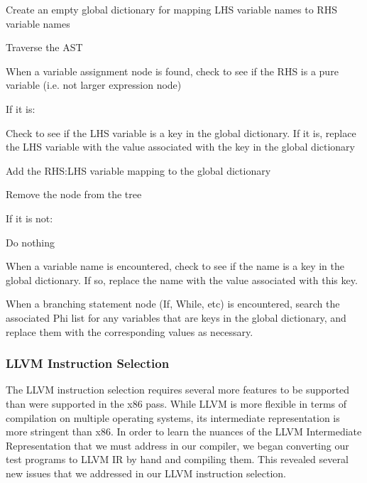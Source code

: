 \documentclass[11pt,twocolumn]{article}
\newenvironment{packed_enum}{
\begin{enumerate}
  \setlength{\itemsep}{1pt}
  \setlength{\parskip}{0pt}
  \setlength{\parsep}{0pt}
}{\end{enumerate}}
\begin{document}
\begin{packed_enum}
\item Create an empty global dictionary for mapping LHS variable names
  to RHS variable names
\item Traverse the AST
\item When a variable assignment node is found, check to see if the
  RHS is a pure variable (i.e. not larger expression node)
  \begin{packed_enum}
  \item If it is:
    \begin{packed_enum}
    \item Check to see if the LHS variable is a key in the
      global dictionary. If it is, replace the LHS variable with the
      value associated with the key in the global dictionary
    \item Add the RHS:LHS variable mapping to the global dictionary
    \item Remove the node from the tree
    \end{packed_enum}
  \item If it is not:
    \begin{packed_enum}
      \item Do nothing
    \end{packed_enum}
  \end{packed_enum}
\item When a variable name is encountered, check to see if the name is
  a key in the global dictionary. If so, replace the name with the
  value associated with this key.
\item When a branching statement node (If, While, etc) is encountered,
  search the associated Phi list for any variables that are keys in
  the global dictionary, and replace them with the corresponding
  values as necessary.
\end{packed_enum}

\subsubsection{LLVM Instruction Selection}
\label{sec:stage-LLVMInstructionSelection}

The LLVM instruction selection requires several more features to be
supported than were supported in the x86 pass. While LLVM is more
flexible in terms of compilation on multiple operating systems, its
intermediate representation is more stringent than x86. In order to
learn the nuances of the LLVM Intermediate Representation that we must
address in our compiler, we began converting our test programs
to LLVM IR by hand and compiling them. This revealed several new issues
that we addressed in our LLVM instruction selection.
\end{document}
